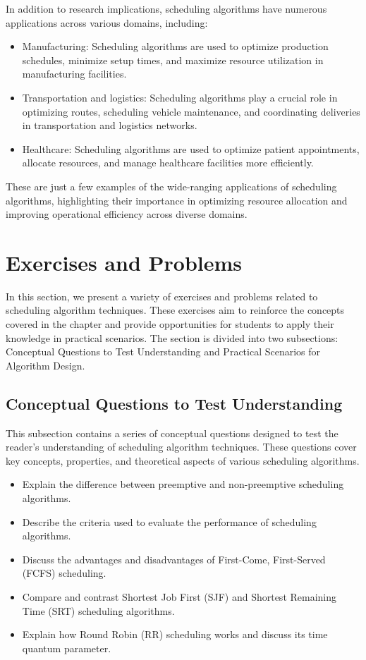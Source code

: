 \documentclass[12pt]{book} %
\begin{document}
In addition to research implications, scheduling algorithms have numerous applications across various domains, including:

\begin{itemize}
    \item Manufacturing: Scheduling algorithms are used to optimize production schedules, minimize setup times, and maximize resource utilization in manufacturing facilities.
    \item Transportation and logistics: Scheduling algorithms play a crucial role in optimizing routes, scheduling vehicle maintenance, and coordinating deliveries in transportation and logistics networks.
    \item Healthcare: Scheduling algorithms are used to optimize patient appointments, allocate resources, and manage healthcare facilities more efficiently.
\end{itemize}

These are just a few examples of the wide-ranging applications of scheduling algorithms, highlighting their importance in optimizing resource allocation and improving operational efficiency across diverse domains.

\section{Exercises and Problems}
In this section, we present a variety of exercises and problems related to scheduling algorithm techniques. These exercises aim to reinforce the concepts covered in the chapter and provide opportunities for students to apply their knowledge in practical scenarios. The section is divided into two subsections: Conceptual Questions to Test Understanding and Practical Scenarios for Algorithm Design.

\subsection{Conceptual Questions to Test Understanding}
This subsection contains a series of conceptual questions designed to test the reader's understanding of scheduling algorithm techniques. These questions cover key concepts, properties, and theoretical aspects of various scheduling algorithms.

\begin{itemize}
    \item Explain the difference between preemptive and non-preemptive scheduling algorithms.
    \item Describe the criteria used to evaluate the performance of scheduling algorithms.
    \item Discuss the advantages and disadvantages of First-Come, First-Served (FCFS) scheduling.
    \item Compare and contrast Shortest Job First (SJF) and Shortest Remaining Time (SRT) scheduling algorithms.
    \item Explain how Round Robin (RR) scheduling works and discuss its time quantum parameter.
\end{itemize}
\end{document}
